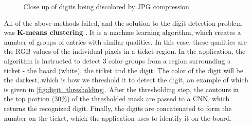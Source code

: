 \documentclass[12pt]{report}
\theoremstyle{definition}
\theoremstyle{remark}
\begin{document}
\begin{enumerate}
    \begin{figure}%
        \centering
        \qquad
        \qquad
        \caption{Close up of digits being discolored by JPG compression}%
        \label{fig:digits}%
    \end{figure}
\end{enumerate}

All of the above methods failed, and the solution to the digit detection problem was \textbf{K-means clustering} \cite{kmeans}. It is a machine learning algorithm, which creates a number of groups of entries with similar qualities. In this case, these qualities are the RGB values of the individual pixels in a ticket region. In the application, the algorithm is instructed to detect 3 color groups from a region surrounding a ticket - the board (white), the ticket and the digit. The color of the digit will be the darkest, which is how we threshold it to detect the digit, an example of which is given in \autoref{fig:digit_thresholding}. After the thresholding step, the contours in the top portion (30\%) of the thresholded mask are passed to a CNN, which returns the recognized digit. Finally, the digits are concatenated to form the number on the ticket, which the application uses to identify it on the board.
\end{document}
